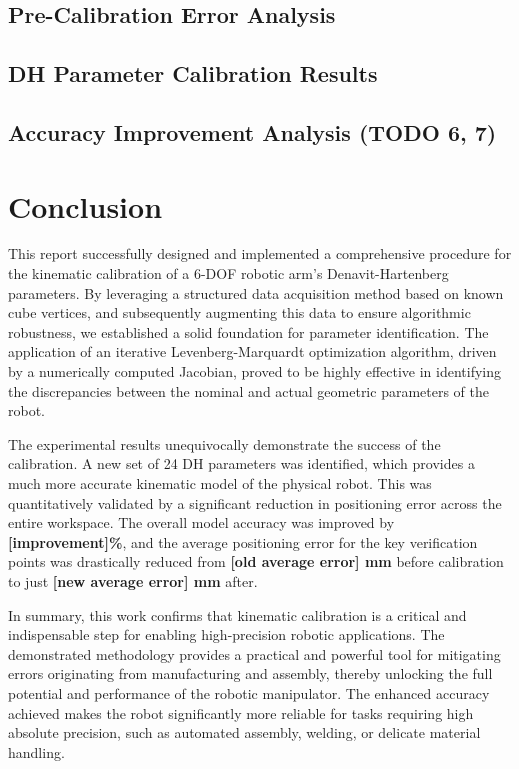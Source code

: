 \documentclass[conference]{IEEEtran}
\begin{document}
\subsection{Pre-Calibration Error Analysis}


\subsection{DH Parameter Calibration Results}

\subsection{Accuracy Improvement Analysis (\textbf{TODO 6, 7})}

\section{Conclusion}
This report successfully designed and implemented a comprehensive procedure for the kinematic calibration of a 6-DOF robotic arm's Denavit-Hartenberg parameters. By leveraging a structured data acquisition method based on known cube vertices, and subsequently augmenting this data to ensure algorithmic robustness, we established a solid foundation for parameter identification. The application of an iterative Levenberg-Marquardt optimization algorithm, driven by a numerically computed Jacobian, proved to be highly effective in identifying the discrepancies between the nominal and actual geometric parameters of the robot.

The experimental results unequivocally demonstrate the success of the calibration. A new set of 24 DH parameters was identified, which provides a much more accurate kinematic model of the physical robot. This was quantitatively validated by a significant reduction in positioning error across the entire workspace. The overall model accuracy was improved by \textbf{[improvement]\%}, and the average positioning error for the key verification points was drastically reduced from \textbf{[old average error] mm} before calibration to just \textbf{[new average error] mm} after.

In summary, this work confirms that kinematic calibration is a critical and indispensable step for enabling high-precision robotic applications. The demonstrated methodology provides a practical and powerful tool for mitigating errors originating from manufacturing and assembly, thereby unlocking the full potential and performance of the robotic manipulator. The enhanced accuracy achieved makes the robot significantly more reliable for tasks requiring high absolute precision, such as automated assembly, welding, or delicate material handling.
\end{document}
